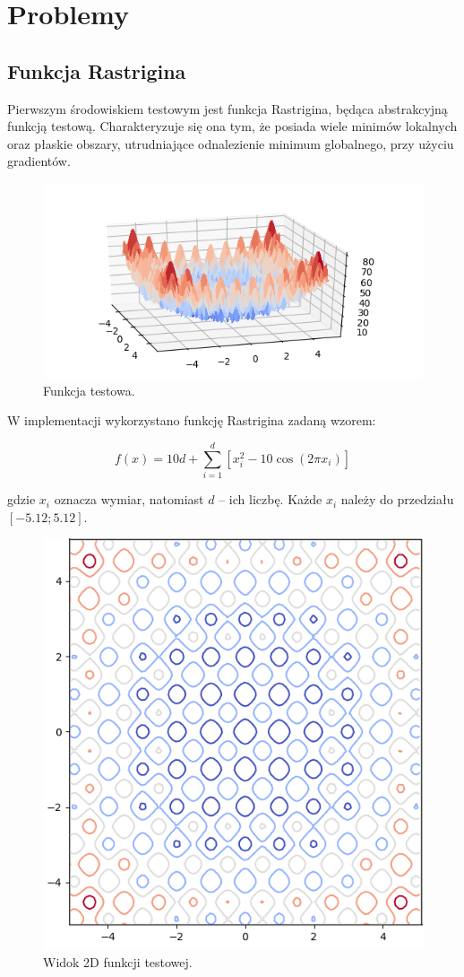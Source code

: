 \pagebreak
\section{Problemy}

\subsection{Funkcja Rastrigina}

Pierwszym środowiskiem testowym jest funkcja Rastrigina, będąca abstrakcyjną funkcją testową. Charakteryzuje się ona tym, że posiada wiele minimów lokalnych oraz płaskie obszary, utrudniające odnalezienie minimum globalnego, przy użyciu gradientów.

\begin{figure}[H]
	\centering
	\includegraphics[width=\linewidth]{imgs/rastrigin_plot}
	\caption{Funkcja testowa.}
	\label{fig:rastrigin_plot}
\end{figure}

W implementacji wykorzystano funkcję Rastrigina zadaną wzorem:

$$f(x) = 10d + \sum_{i=1}^{d} [x_{i}^{2} - 10 \cos(2 \pi x_{i})]$$

gdzie $x_{i}$ oznacza wymiar, natomiast $d$ -- ich liczbę. Każde $x_{i}$ należy do przedziału $[-5.12; 5.12]$. 

\begin{figure}[H]
	\centering
	\includegraphics[width=0.4\linewidth]{imgs/rastrigin_2d_plot}
	\caption{Widok 2D funkcji testowej.}
	\label{fig:rastrigin_2d_plot}
\end{figure}


